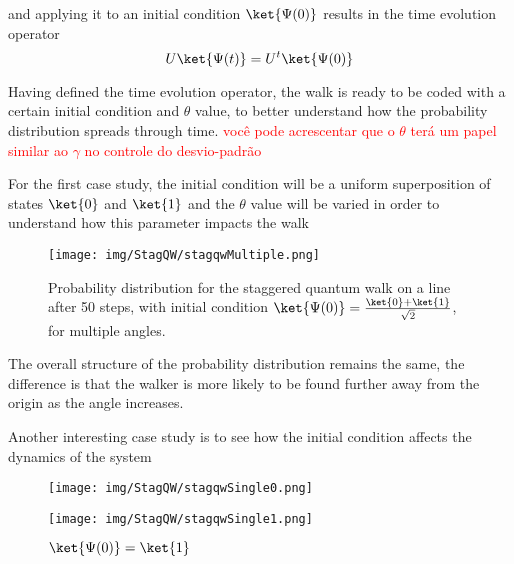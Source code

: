                 and applying it to an initial condition $\ket{\Psi(0)}$ results in the time evolution operator
                \begin{equation}
                    U\ket{\Psi(t)} = U^t\ket{\Psi(0)}
                \end{equation}\par
                Having defined the time evolution operator, the walk is ready to be coded with a certain initial condition and $\theta$ value, to better understand how the probability distribution spreads through time. \textcolor{red}{você pode acrescentar que o $\theta$ terá um papel similar ao $\gamma$ no controle do desvio-padrão}
                
                For the first case study, the initial condition will be a uniform superposition of states $\ket{0}$ and $\ket{1}$ and the $\theta$ value will be varied in order to understand how this parameter impacts the walk
                
            	\begin{figure}[!h]
                    \centering
                    \texttt{[image: img/StagQW/stagqwMultiple.png]}
                    \caption{Probability distribution for the staggered quantum walk on a line after 50 steps, with initial condition $\ket{\Psi(0)}=\frac{\ket{0}+\ket{1}}{\sqrt{2}}$, for multiple angles.} 
                    \label{fig:fig5}
                \end{figure}
                
                The overall structure of the probability distribution remains the same, the difference is that the walker is more likely to be found further away from the origin as the angle increases.\par
                Another interesting case study is to see how the initial condition affects the dynamics of the system
                
                \begin{figure}[!h]
                        \texttt{[image: img/StagQW/stagqwSingle0.png]}
                        \caption{$\ket{\Psi(0)}=\ket{0}$}\label{fig:fig6}
                    \endminipage\hfill
                        \texttt{[image: img/StagQW/stagqwSingle1.png]}
                      \caption{$\ket{\Psi(0)}=\ket{1}$}\label{fig:fig7}
                    \endminipage\hfill
                \end{figure}
                
